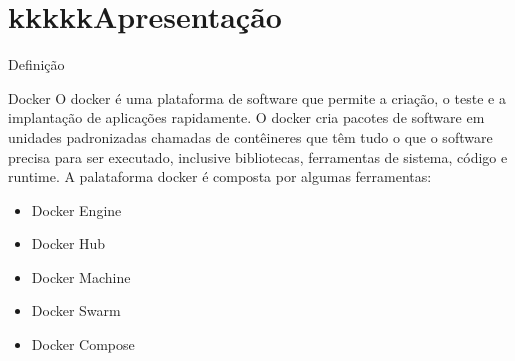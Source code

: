 \section{kkkkkApresentação}

    \begin{frame}{Definição}
        \begin{block}{Docker}
            O docker é uma plataforma de software que permite a criação, o teste e a implantação de aplicações rapidamente. O docker cria pacotes de software em unidades padronizadas chamadas de contêineres que têm tudo o que o software precisa para ser executado, inclusive bibliotecas, ferramentas de sistema, código e runtime. A palataforma docker é composta por algumas ferramentas:
            \begin{itemize}
                \item Docker Engine
                \item Docker Hub
                \item Docker Machine
                \item Docker Swarm
                \item Docker Compose
            \end{itemize}
        \end{block}
    \end{frame}
